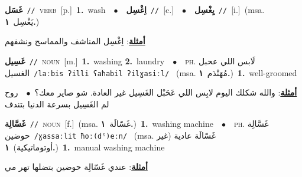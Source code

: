 \documentclass[10pt,a4paper,twoside]{article} %
\begin{document}
\begin{multicols}{2}
{\setlength\topsep{0pt}\textbf{\foreignlanguage{arabic}{غَسَل}}\ {\color{gray}\texttt{//}\color{black}}\ \textsc{verb}\ [p.]\ \textbf{1.}~wash\ \ $\bullet$\ \ \setlength\topsep{0pt}\textbf{\foreignlanguage{arabic}{اِغْسِل}}\ {\color{gray}\texttt{//}\color{black}}\ [c.]\ \ $\bullet$\ \ \setlength\topsep{0pt}\textbf{\foreignlanguage{arabic}{يِغْسِل}}\ {\color{gray}\texttt{//}\color{black}}\ [i.]\ \color{gray}(msa. \foreignlanguage{arabic}{يَغْسِل}~\foreignlanguage{arabic}{\textbf{١.}})\color{black}\  \begin{flushright}\color{gray}\foreignlanguage{arabic}{\textbf{\underline{\foreignlanguage{arabic}{أمثلة}}}: اِغْسِل المناشف والمماسح ونشفهم}\end{flushright}\color{black}} \vspace{2mm}

{\setlength\topsep{0pt}\textbf{\foreignlanguage{arabic}{غَسِيل}}\ {\color{gray}\texttt{//}\color{black}}\ \textsc{noun}\ [m.]\ \textbf{1.}~washing  \textbf{2.}~laundry\ \ $\bullet$\ \ \textsc{ph.} \color{gray} \foreignlanguage{arabic}{لَابس اللي عحبل الغسيل}\color{black}\ {\color{gray}\texttt{/{\sffamily laːbis ʔilli ʕaħabil ʔilɣasiːl}/}\color{black}}\ \color{gray} (msa. \foreignlanguage{arabic}{مُهَنْدَم}~\foreignlanguage{arabic}{\textbf{١.}})\color{black}\ \textbf{1.}~well-groomed\  \begin{flushright}\color{gray}\foreignlanguage{arabic}{\textbf{\underline{\foreignlanguage{arabic}{أمثلة}}}: والله شكلك اليوم لابِس اللي عَحَبْل الغَسِيل غير العادة. شو صاير معك؟\ $\bullet$\ \  روح لم الغَسِيل بسرعة الدنيا بتندف}\end{flushright}\color{black}} \vspace{2mm}

{\setlength\topsep{0pt}\textbf{\foreignlanguage{arabic}{غَسَّالِة}}\ {\color{gray}\texttt{//}\color{black}}\ \textsc{noun}\ [f.]\ \color{gray}(msa. \foreignlanguage{arabic}{غَسّالَة}~\foreignlanguage{arabic}{\textbf{١.}})\color{black}\ \textbf{1.}~washing machine\ \ $\bullet$\ \ \textsc{ph.} \color{gray} \foreignlanguage{arabic}{غَسَّالِة حوضين}\color{black}\ {\color{gray}\texttt{/{\sffamily ɣassaːlit ħoː(dˤ)eːn}/}\color{black}}\ \color{gray} (msa. \foreignlanguage{arabic}{غَسّالَة عادية (غير أوتوماتيكية)}~\foreignlanguage{arabic}{\textbf{١.}})\color{black}\ \textbf{1.}~manual washing machine\  \begin{flushright}\color{gray}\foreignlanguage{arabic}{\textbf{\underline{\foreignlanguage{arabic}{أمثلة}}}: عندي غَسّالِة حوضين بتضلها تهر مي}\end{flushright}\color{black}} \vspace{2mm}


\end{multicols}
\end{document}
